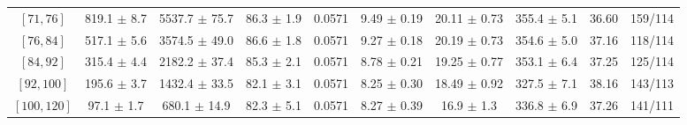 \begin{tabular}{c||c|c|c|c|c|c|c||c|c}
$[71, 76]$ & 819.1 $\pm$ 8.7 & 5537.7 $\pm$ 75.7 & 86.3 $\pm$ 1.9 & 0.0571 & 9.49 $\pm$ 0.19 & 20.11 $\pm$ 0.73 & 355.4 $\pm$ 5.1 & 36.60 & 159/114\\
$[76, 84]$ & 517.1 $\pm$ 5.6 & 3574.5 $\pm$ 49.0 & 86.6 $\pm$ 1.8 & 0.0571 & 9.27 $\pm$ 0.18 & 20.19 $\pm$ 0.73 & 354.6 $\pm$ 5.0 & 37.16 & 118/114\\
$[84, 92]$ & 315.4 $\pm$ 4.4 & 2182.2 $\pm$ 37.4 & 85.3 $\pm$ 2.1 & 0.0571 & 8.78 $\pm$ 0.21 & 19.25 $\pm$ 0.77 & 353.1 $\pm$ 6.4 & 37.25 & 125/114\\
$[92, 100]$ & 195.6 $\pm$ 3.7 & 1432.4 $\pm$ 33.5 & 82.1 $\pm$ 3.1 & 0.0571 & 8.25 $\pm$ 0.30 & 18.49 $\pm$ 0.92 & 327.5 $\pm$ 7.1 & 38.16 & 143/113\\
$[100, 120]$ & 97.1 $\pm$ 1.7 & 680.1 $\pm$ 14.9 & 82.3 $\pm$ 5.1 & 0.0571 & 8.27 $\pm$ 0.39 & 16.9 $\pm$ 1.3 & 336.8 $\pm$ 6.9 & 37.26 & 141/111\\
\end{tabular}
